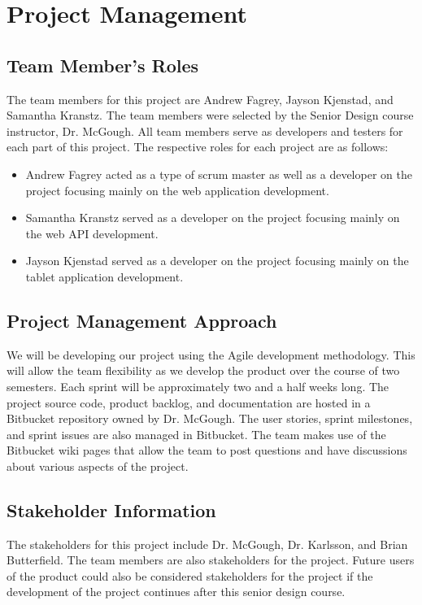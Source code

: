 
\chapter{Project Management}

\section{Team Member's Roles}
The team members for this project are Andrew Fagrey, Jayson Kjenstad, and Samantha Kranstz. The team members were selected by the Senior Design course instructor, Dr. McGough. All team members serve as developers and testers for each part of this project. The respective roles for each project are as follows:

\begin{itemize}
\item Andrew Fagrey acted as a type of scrum master as well as a developer on the project focusing mainly on the web application development.
\item Samantha Kranstz served as a developer on the project focusing mainly on the web API development.
\item Jayson Kjenstad served as a developer on the project focusing mainly on the tablet application development.
\end{itemize}

\section{Project  Management Approach}
We will be developing our project using the Agile development methodology. This will allow the team flexibility as we develop the product over the course of two semesters. Each sprint will be approximately two and a half weeks long. The project source code, product backlog, and documentation are hosted in a Bitbucket repository owned by Dr. McGough. The user stories, sprint milestones, and sprint issues are also managed in Bitbucket. The team makes use of the Bitbucket wiki pages that allow the team to post questions and have discussions about various aspects of the project.

\section{Stakeholder Information}
The stakeholders for this project include Dr. McGough, Dr. Karlsson, and Brian Butterfield. The team members are also stakeholders for the project. Future users of the product could also be considered stakeholders for the project if the development of the project continues after this senior design course.

